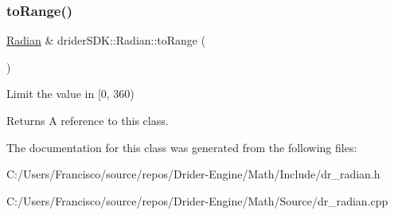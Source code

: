 \subsubsection{\texorpdfstring{to\+Range()}{toRange()}}
{\footnotesize\ttfamily \hyperlink{classdrider_s_d_k_1_1_radian}{Radian} \& drider\+S\+D\+K\+::\+Radian\+::to\+Range (\begin{DoxyParamCaption}{ }\end{DoxyParamCaption})}

Limit the value in \mbox{[}0, 360)

\begin{DoxyReturn}{Returns}
A reference to this class. 
\end{DoxyReturn}


The documentation for this class was generated from the following files\+:\begin{DoxyCompactItemize}
\item 
C\+:/\+Users/\+Francisco/source/repos/\+Drider-\/\+Engine/\+Math/\+Include/dr\+\_\+radian.\+h\item 
C\+:/\+Users/\+Francisco/source/repos/\+Drider-\/\+Engine/\+Math/\+Source/dr\+\_\+radian.\+cpp\end{DoxyCompactItemize}
